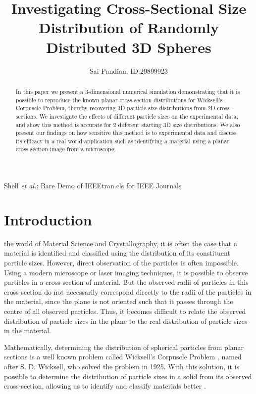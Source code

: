 \documentclass[journal]{IEEEtran}
\begin{document}
\title{Investigating Cross-Sectional Size Distribution of Randomly Distributed
       3D Spheres} 

\author{Sai Pandian, ID:\@ 29899923}%
        
{Shell \MakeLowercase{\textit{et al.}}: Bare Demo of IEEEtran.cls for IEEE Journals}

\maketitle

\begin{abstract}
  In this paper we present a 3-dimensional numerical simulation demonstrating
  that it is possible to reproduce the known planar cross-section distributions
  for Wicksell's Corpuscle Problem, thereby recovering 3D particle size
  distributions from 2D cross-sections. We investigate the effects of different
  particle sizes on the experimental data, and show this method is accurate for
  2 different starting 3D size distributions. We also present our findings on
  how sensitive this method is to experimental data and discuss its efficacy in
  a real world application such as identifying a material using a planar
  cross-section image from a microscope.
\end{abstract}

\section{Introduction}

 the world of Material Science and Crystallography, it is
often the case that a material is identified and classified using the
distribution of its constituent particle sizes. However, direct observation of
the particles is often impossible. Using a modern microscope or laser imaging
techniques, it is possible to observe particles in a cross-section of
material. But the observed radii of particles in this cross-section do not
necessarily correspond directly to the radii of the particles in the material,
since the plane is not oriented such that it passes through the centre of all
observed particles. Thus, it becomes difficult to relate the observed
distribution of particle sizes in the plane to the real distribution of particle
sizes in the material.

Mathematically, determining the distribution of spherical particles from planar
sections is a well known problem called Wicksell's Corpuscle Problem
\cite{DWicksell}, named after S. D. Wicksell, who solved the problem in
1925. With this solution, it is possible to determine the distribution of
particle sizes in a solid from its observed cross-section, allowing us to
identify and classify materials better \cite{Cuzzi2016}.
\end{document}
